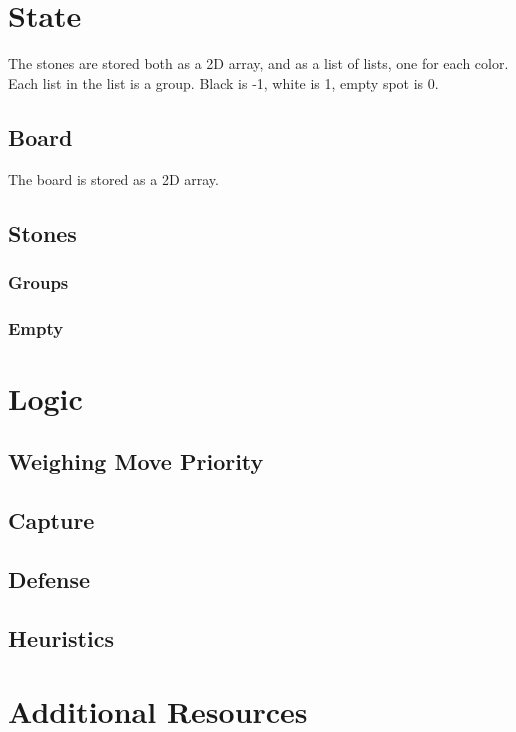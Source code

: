 \documentclass[11pt]{article}
\begin{document}
\section{State}
The stones are stored both as a 2D array, and as a list of lists, one for each color. Each list in the list is a group.
Black is -1, white is 1, empty spot is 0.
\subsection{Board}
The board is stored as a 2D array.
\subsection{Stones}
\subsubsection{Groups}
\subsubsection{Empty}

\section{Logic}
\subsection{Weighing Move Priority}
\subsection{Capture}
\subsection{Defense}
\subsection{Heuristics}

\section{Additional Resources}
\end{document}
